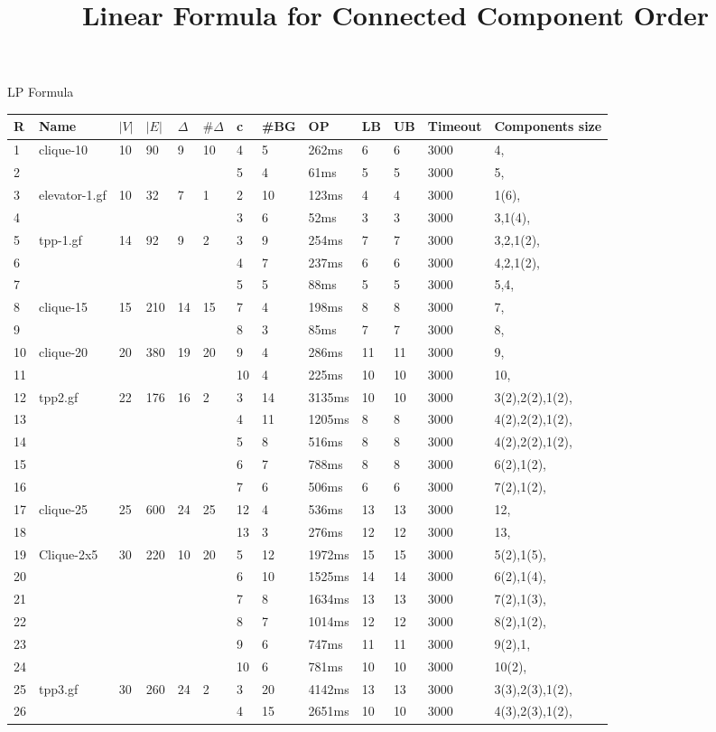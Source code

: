 \documentclass{article}
\title{Linear Formula for Connected Component Order}
\begin{document}
\maketitle
LP Formula
\begin{longtable}{|l |l |l |l |l |l |l |l |l |l |l |l |l |}
\hline
R&Name&$|V|$&$|E|$&$\Delta$&$\# \Delta$&c&\#BG&OP&LB&UB&Timeout&Components size\\
\hline
1&clique-10&10&90&9&10&4&5&262ms&6&6&3000&4,\\
2&&&&&&5&4&61ms&5&5&3000&5,\\
3&elevator-1.gf&10&32&7&1&2&10&123ms&4&4&3000&1(6),\\
4&&&&&&3&6&52ms&3&3&3000&3,1(4),\\
5&tpp-1.gf&14&92&9&2&3&9&254ms&7&7&3000&3,2,1(2),\\
6&&&&&&4&7&237ms&6&6&3000&4,2,1(2),\\
7&&&&&&5&5&88ms&5&5&3000&5,4,\\
8&clique-15&15&210&14&15&7&4&198ms&8&8&3000&7,\\
9&&&&&&8&3&85ms&7&7&3000&8,\\
10&clique-20&20&380&19&20&9&4&286ms&11&11&3000&9,\\
11&&&&&&10&4&225ms&10&10&3000&10,\\
12&tpp2.gf&22&176&16&2&3&14&3135ms&10&10&3000&3(2),2(2),1(2),\\
13&&&&&&4&11&1205ms&8&8&3000&4(2),2(2),1(2),\\
14&&&&&&5&8&516ms&8&8&3000&4(2),2(2),1(2),\\
15&&&&&&6&7&788ms&8&8&3000&6(2),1(2),\\
16&&&&&&7&6&506ms&6&6&3000&7(2),1(2),\\
17&clique-25&25&600&24&25&12&4&536ms&13&13&3000&12,\\
18&&&&&&13&3&276ms&12&12&3000&13,\\
19&Clique-2x5&30&220&10&20&5&12&1972ms&15&15&3000&5(2),1(5),\\
20&&&&&&6&10&1525ms&14&14&3000&6(2),1(4),\\
21&&&&&&7&8&1634ms&13&13&3000&7(2),1(3),\\
22&&&&&&8&7&1014ms&12&12&3000&8(2),1(2),\\
23&&&&&&9&6&747ms&11&11&3000&9(2),1,\\
24&&&&&&10&6&781ms&10&10&3000&10(2),\\
25&tpp3.gf&30&260&24&2&3&20&4142ms&13&13&3000&3(3),2(3),1(2),\\
26&&&&&&4&15&2651ms&10&10&3000&4(3),2(3),1(2),\\

\end{longtable}
\end{document}
